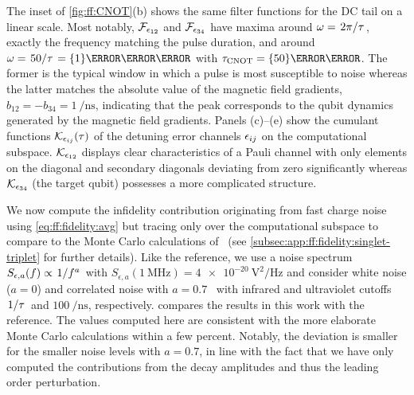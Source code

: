 The inset of \cref{fig:ff:CNOT}(b) shows the same filter functions for the DC tail on a linear scale.
Most notably, $\mathcal{F}_{\epsilon_{12}}$ and $\mathcal{F}_{\epsilon_{34}}$ have maxima around $\omega = \flatfrac{2\pi}{\tau}$, \ie exactly the frequency matching the pulse duration, and around $\omega = \flatfrac{50}{\tau} = \qty{1}{\per\nano\second}$ with $\tau_{\CNOT} = \qty{50}{\nano\second}$.
The former is the typical window in which a pulse is most susceptible to noise whereas the latter matches the absolute value of the magnetic field gradients, $b_{12} = -b_{34} = \qty{1}{\per\nano\second}$, indicating that the peak corresponds to the qubit dynamics generated by the magnetic field gradients.
Panels (c)--(e) show the cumulant functions $\mathcal{K}_{\epsilon_{ij}}(\tau)$ of the detuning error channels $\epsilon_{ij}$ on the computational subspace.
$\mathcal{K}_{\epsilon_{12}}$ displays clear characteristics of a Pauli channel with only elements on the diagonal and secondary diagonals deviating from zero significantly whereas $\mathcal{K}_{\epsilon_{34}}$ (the target qubit) possesses a more complicated structure.

\begin{table}
    \centering
    \caption{
        Fast charge noise infidelity contributions to the total average gate fidelity of the two-qubit gate set from~ without capacitive coupling for GaAs \sts qubits compared to the original results.
        The fidelities are consistent with results from the reference within the uncertainty bounds of \qty{3}{\percent} of the Monte Carlo calculation.
        The infidelities presented here are all average gate infidelities (cf.
        \cref{eq:ff:fidelity:avg},~).
    }
    \label{tab:ff:infidelities}
    
\end{table}

We now compute the infidelity contribution originating from fast charge noise using \cref{eq:ff:fidelity:avg} but tracing only over the computational subspace to compare to the Monte Carlo calculations of~ (see \cref{subsec:app:ff:fidelity:singlet-triplet} for further details).
Like the reference, we use a noise spectrum $S_{\epsilon,a}(f)\propto \flatfrac{1}{f^a}$ with $S_{\epsilon,a}(\qty{1}{\MHz}) = \qty{4e-20}{\volt\squared\per\Hz}$ and consider white noise ($a = 0$) and correlated noise with $a = 0.7$~\cite{Dial2013} with infrared and ultraviolet cutoffs $\flatfrac{1}{\tau}$ and $\qty{100}{\per\nano\second}$, respectively.
 compares the results in this work with the reference.
The values computed here are consistent with the more elaborate Monte Carlo calculations within a few percent.
Notably, the deviation is smaller for the smaller noise levels with $a = \num{0.7}$, in line with the fact that we have only computed the contributions from the decay amplitudes \decayamps and thus the leading order perturbation.

